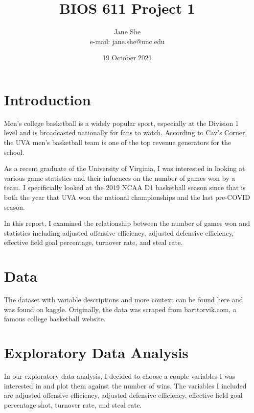 \documentclass{article}
\begin{document}
\title{BIOS 611 Project 1}
\author{Jane She \\ e-mail: jane.she@unc.edu}
\date{19 October 2021}
\maketitle

\section{Introduction}


Men's college basketball is a widely popular sport, especially at the Division 1 level and is broadcasted nationally for fans to watch. According to Cav's Corner, the UVA men's basketball team is one of the top revenue generators for the school. 

As a recent graduate of the University of Virginia, I was interested in looking at various game statistics and their infuences on the number of games won by a team. I specificially looked at the 2019 NCAA D1 basketball season since that is both the year that UVA won the national championships and the last pre-COVID season.

In this report, I examined the relationship between the number of games won and statistics including adjusted offensive efficiency, adjusted defensive efficiency, effective field goal percentage, turnover rate, and steal rate.

\section{Data}

The dataset with variable descriptions and more context can be found \href{https://www.kaggle.com/andrewsundberg/college-basketball-dataset}{here} and was found on kaggle. Originally, the data was scraped from barttorvik.com, a famous college basketball website. 

\section{Exploratory Data Analysis}

In our exploratory data analysis, I decided to choose a couple variables I was interested in and plot them against the number of wins. The variables I included are adjusted offensive efficiency, adjusted defensive efficiency, effective field goal percentage shot, turnover rate, and steal rate.
\end{document}
